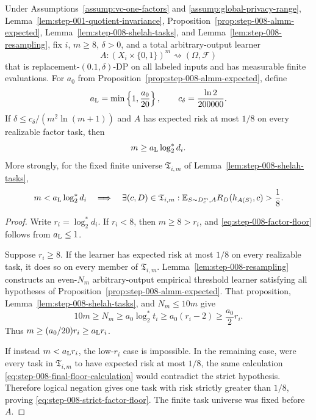 \begin{proposition}
\label{prop:step-008-factor-floor}
Under Assumptions~\ref{assump:vc-one-factors} and
\ref{assump:global-privacy-range}, Lemma~\ref{lem:step-001-quotient-invariance},
Proposition~\ref{prop:step-008-almm-expected},
Lemma~\ref{lem:step-008-shelah-tasks}, and
Lemma~\ref{lem:step-008-resampling}, fix \(i\), \(m\ge8\), \(\delta>0\),
and a total arbitrary-output learner
\[
A:(X_i\times\{0,1\})^m\rightsquigarrow(\Omega,\mathscr F)
\]
that is replacement-\((0.1,\delta)\)-DP on all labeled inputs and has
measurable finite evaluations.  For \(a_0\) from
Proposition~\ref{prop:step-008-almm-expected}, define
\begin{equation}\label{eq:step-008-floor-constants}
a_{\rm L}=\min\left\{1,\frac{a_0}{20}\right\},
\qquad
c_\delta=\frac{\ln2}{200000}.
\end{equation}
If \(\delta\le c_\delta/(m^2\ln(m+1))\) and \(A\) has expected risk at
most \(1/8\) on every realizable factor task, then
\begin{equation}\label{eq:step-008-factor-floor}
m\ge a_{\rm L}\log_2^*d_i.
\end{equation}
More strongly, for the fixed finite universe
\(\mathfrak T_{i,m}\) of Lemma~\ref{lem:step-008-shelah-tasks},
\begin{equation}\label{eq:step-008-strict-factor-floor}
m<a_{\rm L}\log_2^*d_i
\quad\Longrightarrow\quad
\exists(c,D)\in\mathfrak T_{i,m}:
\mathbb E_{S\sim D_c^m,A}R_D(h_{A(S)},c)>\frac18.
\end{equation}
\end{proposition}

\begin{proof}
Write \(r_i=\log_2^*d_i\).  If \(r_i<8\), then
\(m\ge8>r_i\), and \eqref{eq:step-008-factor-floor} follows from
\(a_{\rm L}\le1\).

Suppose \(r_i\ge8\).  If the learner has expected risk at most \(1/8\)
on every realizable task, it does so on every member of
\(\mathfrak T_{i,m}\).  Lemma~\ref{lem:step-008-resampling} constructs an
even-\(N_m\) arbitrary-output empirical threshold learner satisfying all
hypotheses of Proposition~\ref{prop:step-008-almm-expected}.  That
proposition, Lemma~\ref{lem:step-008-shelah-tasks}, and \(N_m\le10m\)
give
\begin{equation}\label{eq:step-008-final-floor-calculation}
10m\ge N_m
\ge a_0\log_2^*t_i
\ge a_0(r_i-2)
\ge\frac{a_0}{2}r_i.
\end{equation}
Thus \(m\ge(a_0/20)r_i\ge a_{\rm L}r_i\).

If instead \(m<a_{\rm L}r_i\), the low-\(r_i\) case is impossible.  In
the remaining case, were every task in \(\mathfrak T_{i,m}\) to have
expected risk at most \(1/8\), the same calculation
\eqref{eq:step-008-final-floor-calculation} would contradict the strict
hypothesis.  Therefore logical negation gives one task with risk strictly
greater than \(1/8\), proving
\eqref{eq:step-008-strict-factor-floor}.  The finite task universe was
fixed before \(A\).
\end{proof}

